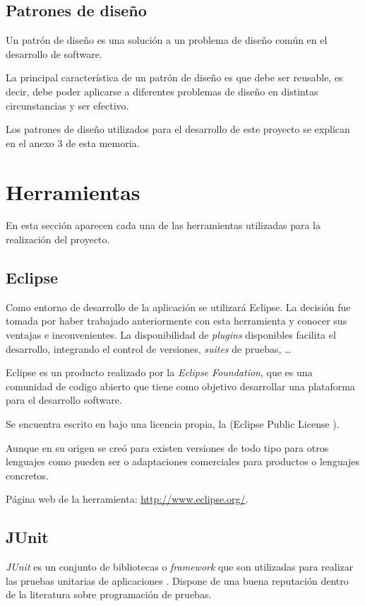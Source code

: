 \subsection{Patrones de diseño}
Un patrón de diseño es una solución a un problema de diseño común en el desarrollo de software.

La principal característica de un patrón de diseño es que debe ser reusable, es decir, debe poder aplicarse a diferentes problemas de diseño en distintas circunstancias y ser efectivo.

Los patrones de diseño utilizados para el desarrollo de este proyecto se explican en el anexo 3 de esta memoria.



\section{Herramientas}
En esta sección aparecen cada una de las herramientas utilizadas para la realización del proyecto.


\subsection{Eclipse}
Como entorno de desarrollo de la aplicación se utilizará Eclipse. La decisión fue tomada por haber trabajado anteriormente con esta herramienta y conocer sus ventajas e inconvenientes. La disponibilidad de \textit{plugins} disponibles facilita el desarrollo, integrando el control de versiones, \textit{suites} de pruebas, \dots

Eclipse es un producto realizado por la \textit{Eclipse Foundation}, que es una comunidad de codigo abierto que tiene como objetivo desarrollar una plataforma para el desarrollo software.

Se encuentra escrito en \java{} bajo una licencia propia, la \epl{} (Eclipse Public License \cite{epl}).

Aunque en su origen se creó para \java{} existen versiones de todo tipo para otros lenguajes como pueden ser \clang{} o adaptaciones comerciales para productos o lenguajes concretos.

Página web de la herramienta: \url{http://www.eclipse.org/}.


\subsection{JUnit}
\textit{JUnit} es un conjunto de bibliotecas o \textit{framework} que son utilizadas para realizar las pruebas unitarias de aplicaciones \java{}. Dispone de una buena reputación dentro de la literatura sobre programación de pruebas.

